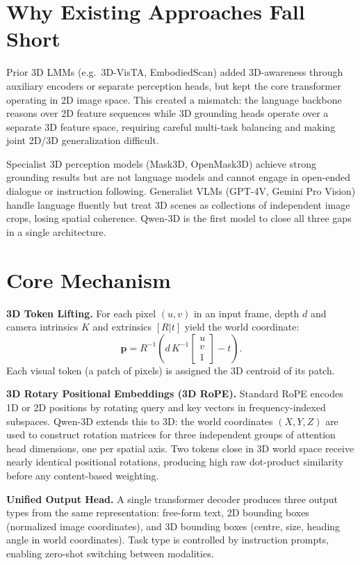 \documentclass[10pt,twocolumn]{article}
\begin{document}
\section{Why Existing Approaches Fall Short}

Prior 3D LMMs (e.g.\ 3D-VisTA, EmbodiedScan) added 3D-awareness through auxiliary
encoders or separate perception heads, but kept the core transformer operating in
2D image space. This created a mismatch: the language backbone reasons over 2D
feature sequences while 3D grounding heads operate over a separate 3D feature space,
requiring careful multi-task balancing and making joint 2D/3D generalization difficult.

Specialist 3D perception models (Mask3D, OpenMask3D) achieve strong grounding results
but are not language models and cannot engage in open-ended dialogue or instruction
following. Generalist VLMs (GPT-4V, Gemini Pro Vision) handle language fluently but
treat 3D scenes as collections of independent image crops, losing spatial coherence.
Qwen-3D is the first model to close all three gaps in a single architecture.

\section{Core Mechanism}

\textbf{3D Token Lifting.}
For each pixel $(u, v)$ in an input frame, depth $d$ and camera intrinsics
$K$ and extrinsics $[R | t]$ yield the world coordinate:
\[
\mathbf{p} = R^{-1}\!\left(d\,K^{-1}\begin{bmatrix}u\\v\\1\end{bmatrix} - t\right).
\]
Each visual token (a patch of pixels) is assigned the 3D centroid of its patch.

\textbf{3D Rotary Positional Embeddings (3D RoPE).}
Standard RoPE encodes 1D or 2D positions by rotating query and key vectors in
frequency-indexed subspaces. Qwen-3D extends this to 3D: the world coordinates
$(X, Y, Z)$ are used to construct rotation matrices for three independent groups
of attention head dimensions, one per spatial axis. Two tokens close in 3D world
space receive nearly identical positional rotations, producing high raw dot-product
similarity before any content-based weighting.

\textbf{Unified Output Head.}
A single transformer decoder produces three output types from the same representation:
free-form text, 2D bounding boxes (normalized image coordinates), and 3D bounding
boxes (centre, size, heading angle in world coordinates). Task type is controlled by
instruction prompts, enabling zero-shot switching between modalities.
\end{document}
